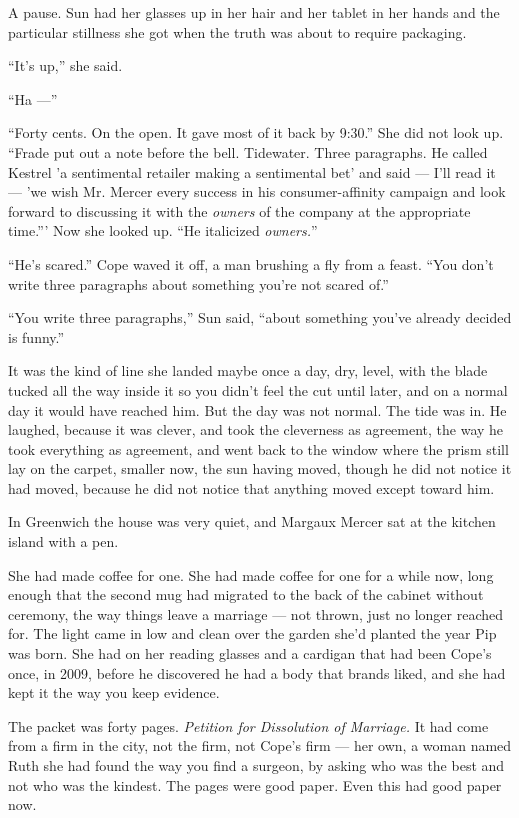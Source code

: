 \documentclass[11pt,openany]{book}
\newcommand{\scenebreak}{\par\vspace{0.5\baselineskip}\begin{center}\textasteriskcentered\quad\textasteriskcentered\quad\textasteriskcentered\end{center}\vspace{0.5\baselineskip}\par}
\begin{document}
A pause. Sun had her glasses up in her hair and her tablet in her hands and the particular stillness she got when the truth was about to require packaging.

``It's up,'' she said.

``Ha ---''

``Forty cents. On the open. It gave most of it back by 9:30.'' She did not look up. ``Frade put out a note before the bell. Tidewater. Three paragraphs. He called Kestrel 'a sentimental retailer making a sentimental bet' and said --- I'll read it --- 'we wish Mr. Mercer every success in his consumer-affinity campaign and look forward to discussing it with the \textit{owners} of the company at the appropriate time.''' Now she looked up. ``He italicized \textit{owners.}''

``He's scared.'' Cope waved it off, a man brushing a fly from a feast. ``You don't write three paragraphs about something you're not scared of.''

``You write three paragraphs,'' Sun said, ``about something you've already decided is funny.''

It was the kind of line she landed maybe once a day, dry, level, with the blade tucked all the way inside it so you didn't feel the cut until later, and on a normal day it would have reached him. But the day was not normal. The tide was in. He laughed, because it was clever, and took the cleverness as agreement, the way he took everything as agreement, and went back to the window where the prism still lay on the carpet, smaller now, the sun having moved, though he did not notice it had moved, because he did not notice that anything moved except toward him.


\scenebreak


In Greenwich the house was very quiet, and Margaux Mercer sat at the kitchen island with a pen.

She had made coffee for one. She had made coffee for one for a while now, long enough that the second mug had migrated to the back of the cabinet without ceremony, the way things leave a marriage --- not thrown, just no longer reached for. The light came in low and clean over the garden she'd planted the year Pip was born. She had on her reading glasses and a cardigan that had been Cope's once, in 2009, before he discovered he had a body that brands liked, and she had kept it the way you keep evidence.

The packet was forty pages. \textit{Petition for Dissolution of Marriage.} It had come from a firm in the city, not the firm, not Cope's firm --- her own, a woman named Ruth she had found the way you find a surgeon, by asking who was the best and not who was the kindest. The pages were good paper. Even this had good paper now.
\end{document}
